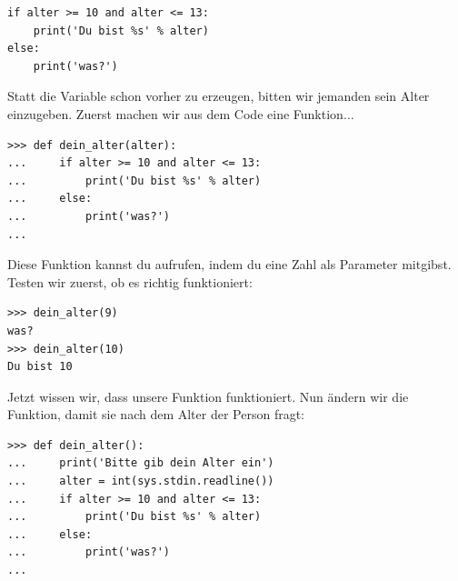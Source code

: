 \begin{Verbatim}[frame=single]
if alter >= 10 and alter <= 13:
    print('Du bist %s' % alter)
else:
    print('was?')
\end{Verbatim}

Statt die Variable  schon vorher zu erzeugen, bitten wir jemanden sein Alter einzugeben. Zuerst machen wir aus dem Code eine Funktion$\ldots$

\begin{Verbatim}[frame=single]
>>> def dein_alter(alter):
...     if alter >= 10 and alter <= 13:
...         print('Du bist %s' % alter)
...     else:
...         print('was?')
...
\end{Verbatim}

Diese Funktion kannst du aufrufen, indem du eine Zahl als Parameter mitgibst. Testen wir zuerst, ob es richtig funktioniert:

\begin{Verbatim}[frame=single]
>>> dein_alter(9)
was?
>>> dein_alter(10)
Du bist 10
\end{Verbatim}

Jetzt wissen wir, dass unsere Funktion funktioniert. Nun ändern wir die Funktion, damit sie nach dem Alter der Person fragt:

\begin{Verbatim}[frame=single]
>>> def dein_alter():
...     print('Bitte gib dein Alter ein')
...     alter = int(sys.stdin.readline())
...     if alter >= 10 and alter <= 13:
...         print('Du bist %s' % alter)
...     else:
...         print('was?')
...
\end{Verbatim}

